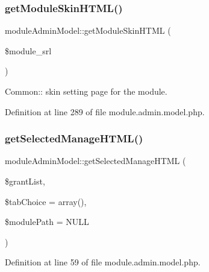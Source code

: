 \hypertarget{classmoduleAdminModel_a7d52af7d5e35ad9ea0749a550e28e483}{}\label{classmoduleAdminModel_a7d52af7d5e35ad9ea0749a550e28e483} 
\subsubsection{\texorpdfstring{get\+Module\+Skin\+H\+T\+M\+L()}{getModuleSkinHTML()}}
{\footnotesize\ttfamily module\+Admin\+Model\+::get\+Module\+Skin\+H\+T\+ML (\begin{DoxyParamCaption}\item[{}]{\$module\+\_\+srl }\end{DoxyParamCaption})}



Common\+:\+: skin setting page for the module. 



Definition at line 289 of file module.\+admin.\+model.\+php.

\hypertarget{classmoduleAdminModel_ada2b0f866658526c7cf2bb5876b0c087}{}\label{classmoduleAdminModel_ada2b0f866658526c7cf2bb5876b0c087} 
\subsubsection{\texorpdfstring{get\+Selected\+Manage\+H\+T\+M\+L()}{getSelectedManageHTML()}}
{\footnotesize\ttfamily module\+Admin\+Model\+::get\+Selected\+Manage\+H\+T\+ML (\begin{DoxyParamCaption}\item[{}]{\$grant\+List,  }\item[{}]{\$tab\+Choice = {\ttfamily array()},  }\item[{}]{\$module\+Path = {\ttfamily NULL} }\end{DoxyParamCaption})}



Definition at line 59 of file module.\+admin.\+model.\+php.

\hypertarget{classmoduleAdminModel_ad12d0ad0d64fc00df2ffef5d95446ff9}{}\label{classmoduleAdminModel_ad12d0ad0d64fc00df2ffef5d95446ff9} 
